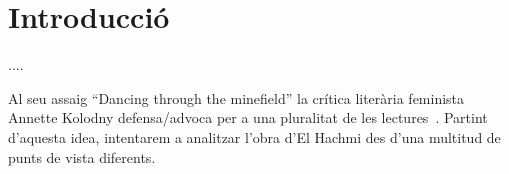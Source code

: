 \section{Introducció}

....

Al seu assaig ``Dancing through the minefield'' la crítica literària feminista Annette Kolodny defensa/advoca per a una pluralitat de les lectures~\cite{Kolodny1980}.
Partint d'aquesta idea, intentarem a analitzar l'obra d'El Hachmi des d'una multitud de punts de vista diferents.


\begin{comment}
Fragestellung:
??
verschiedene readings anbieten:
* interseccionalitat
* translation/language
* laurie penny

--> adrienne rich/anette kolodny in die intro nehmen
Annette Kolodny: "In my view, our purpose is not and should not be the formulation of
any single reading method or potentially procrustean set of critical procedures[...] Instead, as I see it, our
task is to initiate nothing less than a playful pluralism, responsice to the possibilities of multiple critical
schools and methods, but captive of none.."
Leitfragen/themen:
* Qui és català? Qui decideix?
* La dona entre dues cultures i dues societats: expectacions, sentiments,... | interseccionalitat
* La dona en una societat machista                                           |
* coming-of-age
* el paper de la llengua

------

Motto candidates:

“The greatest masterpiece in literature is only a dictionary out of order.”
― Jean Cocteau
VA: Jean Cocteau once quipped that even the greatest masterpieces of literature are nothing but a
dictionary out of order.
(Stavans: Dictionaries Interview)

"IS: Every translation is a misrepresentation."
(Stavans: Dictionaries Interview)
\end{comment}
